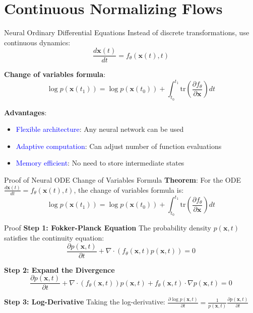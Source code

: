 \documentclass[aspectratio=169]{beamer}
\begin{document}
\section{Continuous Normalizing Flows}

\begin{frame}{Neural Ordinary Differential Equations}
Instead of discrete transformations, use continuous dynamics:
\begin{equation}
    \frac{d\mathbf{x}(t)}{dt} = f_\theta(\mathbf{x}(t), t)
\end{equation}

\textbf{Change of variables formula}:
\begin{equation}
    \log p(\mathbf{x}(t_1)) = \log p(\mathbf{x}(t_0)) + \int_{t_0}^{t_1} \text{tr}\left(\frac{\partial f_\theta}{\partial \mathbf{x}}\right) dt
\end{equation}

\textbf{Advantages}:
\begin{itemize}
    \item \textcolor{blue}{Flexible architecture}: Any neural network can be used
    \item \textcolor{blue}{Adaptive computation}: Can adjust number of function evaluations
    \item \textcolor{blue}{Memory efficient}: No need to store intermediate states
\end{itemize}
\end{frame}

\begin{frame}{Proof of Neural ODE Change of Variables Formula}
\textbf{Theorem}: For the ODE $\frac{d\mathbf{x}(t)}{dt} = f_\theta(\mathbf{x}(t), t)$, the change of variables formula is:
\begin{equation}
    \log p(\mathbf{x}(t_1)) = \log p(\mathbf{x}(t_0)) + \int_{t_0}^{t_1} \text{tr}\left(\frac{\partial f_\theta}{\partial \mathbf{x}}\right) dt
\end{equation}

\begin{block}{Proof}
\small
\textbf{Step 1: Fokker-Planck Equation}
The probability density $p(\mathbf{x}, t)$ satisfies the continuity equation:
\begin{equation}
    \frac{\partial p(\mathbf{x}, t)}{\partial t} + \nabla \cdot (f_\theta(\mathbf{x}, t) p(\mathbf{x}, t)) = 0
\end{equation}

\textbf{Step 2: Expand the Divergence}
\begin{equation}
    \frac{\partial p(\mathbf{x}, t)}{\partial t} + \nabla \cdot (f_\theta(\mathbf{x}, t)) p(\mathbf{x}, t) + f_\theta(\mathbf{x}, t) \cdot \nabla p(\mathbf{x}, t) = 0
\end{equation}

\textbf{Step 3: Log-Derivative}
Taking the log-derivative: $\frac{\partial \log p(\mathbf{x}, t)}{\partial t} = \frac{1}{p(\mathbf{x}, t)} \frac{\partial p(\mathbf{x}, t)}{\partial t}$
\end{block}
\end{frame}
\end{document}
